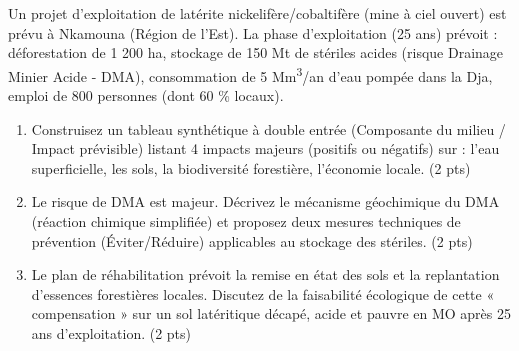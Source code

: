 \documentclass[11pt]{article}
\begin{document}
\begin{exercice}
\label{exo:mine_nkamouna}
Un projet d'exploitation de latérite nickelifère/cobaltifère (mine à ciel ouvert) est prévu à Nkamouna (Région de l'Est). La phase d'exploitation (25 ans) prévoit : déforestation de 1 200 ha, stockage de 150 Mt de stériles acides (risque Drainage Minier Acide - DMA), consommation de 5 Mm\textsuperscript{3}/an d'eau pompée dans la Dja, emploi de 800 personnes (dont 60 \% locaux).

\begin{enumerate}
    \item Construisez un tableau synthétique à double entrée (Composante du milieu / Impact prévisible) listant 4 impacts majeurs (positifs ou négatifs) sur : l'eau superficielle, les sols, la biodiversité forestière, l'économie locale. (2 pts)
    \item Le risque de DMA est majeur. Décrivez le mécanisme géochimique du DMA (réaction chimique simplifiée) et proposez deux mesures techniques de prévention (Éviter/Réduire) applicables au stockage des stériles. (2 pts)
    \item Le plan de réhabilitation prévoit la remise en état des sols et la replantation d'essences forestières locales. Discutez de la faisabilité écologique de cette « compensation » sur un sol latéritique décapé, acide et pauvre en MO après 25 ans d'exploitation. (2 pts)
\end{enumerate}
\end{exercice}
\end{document}
